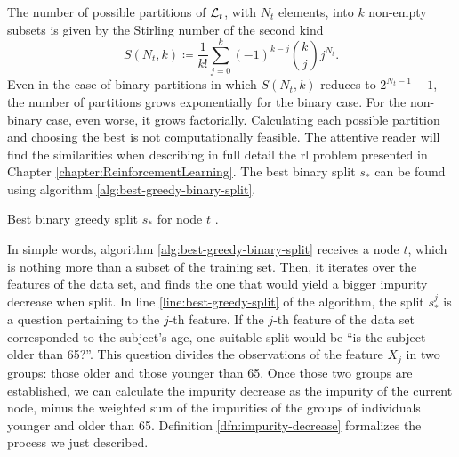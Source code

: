 The number of possible partitions of $\mathcal{L}_t$, with $N_t$ elements, into $k$
non-empty subsets is given by the Stirling number of the second kind
\cite{louppe2014}
\[
    S(N_t, k) \coloneqq \frac{1}{k!} \sum_{j=0}^{k} (-1)^{k-j} \binom{k}{j} j^{N_t}.
\]
Even in the case of binary partitions in which $S(N_t, k)$ reduces to $2^{N_t
-1}-1$, the number of partitions grows exponentially for the binary case. For
the non-binary case, even worse, it grows factorially. Calculating each possible
partition and choosing the best is not computationally feasible. The attentive
reader will find the similarities when describing in full detail the \ac{rl}
problem presented in Chapter \ref{chapter:ReinforcementLearning}. The best
binary split $s_*$ can be found using algorithm
\ref{alg:best-greedy-binary-split}.

\begin{algorithm}
    \caption[Best binary, greedy, split for node $t$.]{Best binary greedy split $s_*$ for node $t$ \cite[Ch.~3.6.3]{louppe2014}.}
    \label{alg:best-greedy-binary-split}
\end{algorithm}

In simple words, algorithm \ref{alg:best-greedy-binary-split} receives a node
$t$, which is nothing more than a subset of the training set. Then, it iterates
over the features of the data set, and finds the one that would yield a bigger
impurity decrease when split. In line \ref{line:best-greedy-split} of the
algorithm, the split $s_{*}^{j}$ is a question pertaining to the $j$-th feature.
If the $j$-th feature of the data set corresponded to the subject's age, one
suitable split would be ``is the subject older than 65?''. This question divides
the observations of the feature $X_j$ in two groups: those older and those
younger than 65. Once those two groups are established, we can calculate the
impurity decrease as the impurity of the current node, minus the weighted sum of
the impurities of the groups of individuals younger and older than 65.
Definition \ref{dfn:impurity-decrease} formalizes the process we just described.

